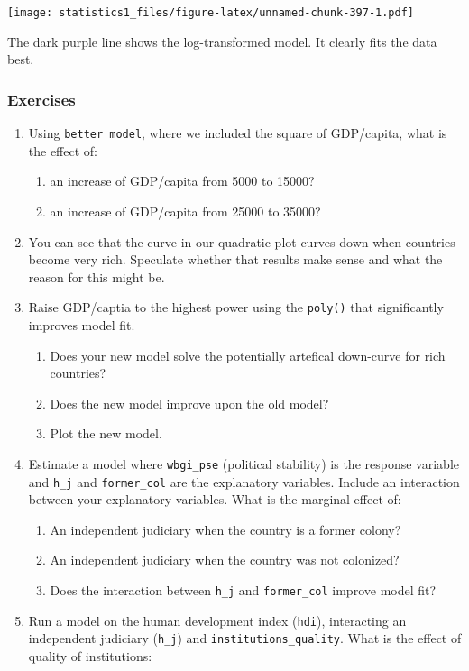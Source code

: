 \documentclass[]{article}
\providecommand{\tightlist}{%
  \setlength{\itemsep}{0pt}\setlength{\parskip}{0pt}}
\theoremstyle{definition}
\theoremstyle{definition}
\theoremstyle{definition}
\theoremstyle{remark}
\begin{document}
\texttt{[image: statistics1\_files/figure-latex/unnamed-chunk-397-1.pdf]}

The dark purple line shows the log-transformed model. It clearly fits
the data best.

\subsubsection{Exercises}\label{exercises-7}

\begin{enumerate}
\def\labelenumi{\arabic{enumi}.}
\tightlist
\item
  Using \texttt{better\ model}, where we included the square of
  GDP/capita, what is the effect of:

  \begin{enumerate}
  \def\labelenumii{\alph{enumii}.}
  \tightlist
  \item
    an increase of GDP/capita from 5000 to 15000?
  \item
    an increase of GDP/capita from 25000 to 35000?
  \end{enumerate}
\item
  You can see that the curve in our quadratic plot curves down when
  countries become very rich. Speculate whether that results make sense
  and what the reason for this might be.
\item
  Raise GDP/captia to the highest power using the \texttt{poly()} that
  significantly improves model fit.

  \begin{enumerate}
  \def\labelenumii{\alph{enumii}.}
  \tightlist
  \item
    Does your new model solve the potentially artefical down-curve for
    rich countries?
  \item
    Does the new model improve upon the old model?
  \item
    Plot the new model.
  \end{enumerate}
\item
  Estimate a model where \texttt{wbgi\_pse} (political stability) is the
  response variable and \texttt{h\_j} and \texttt{former\_col} are the
  explanatory variables. Include an interaction between your explanatory
  variables. What is the marginal effect of:

  \begin{enumerate}
  \def\labelenumii{\alph{enumii}.}
  \tightlist
  \item
    An independent judiciary when the country is a former colony?
  \item
    An independent judiciary when the country was not colonized?
  \item
    Does the interaction between \texttt{h\_j} and \texttt{former\_col}
    improve model fit?
  \end{enumerate}
\item
  Run a model on the human development index (\texttt{hdi}), interacting
  an independent judiciary (\texttt{h\_j}) and
  \texttt{institutions\_quality}. What is the effect of quality of
  institutions:


\end{enumerate}
\end{document}
